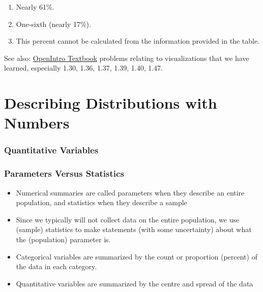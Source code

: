 \documentclass[
  letterpaper,
  DIV=11,
  numbers=noendperiod]{scrreprt}
\providecommand{\tightlist}{%
  \setlength{\itemsep}{0pt}\setlength{\parskip}{0pt}}\usepackage{longtable,booktabs,array}
\begin{document}
\begin{enumerate}
\def\labelenumi{\alph{enumi}.}
\tightlist
\item
  Nearly 61\%.
\item
  One-sixth (nearly 17\%).
\item
  This percent cannot be calculated from the information provided in the
  table.
\end{enumerate}

See also:
\href{https://stats.libretexts.org/Bookshelves/Introductory_Statistics/Book\%3A_OpenIntro_Statistics_(Diez_et_al)./01\%3A_Introduction_to_Data/1.E\%3A_Introduction_to_Data_(Exercises)}{OpenIntro
Textbook} problems relating to visualizations that we have learned,
especially 1.30, 1.36, 1.37, 1.39, 1.40, 1.47.

\hypertarget{describing-distributions-with-numbers}{%
\chapter{Describing Distributions with
Numbers}\label{describing-distributions-with-numbers}}

\hypertarget{quantitative-variables-1}{%
\subsection{Quantitative Variables}\label{quantitative-variables-1}}

\hypertarget{parameters-versus-statistics}{%
\subsection{Parameters Versus
Statistics}\label{parameters-versus-statistics}}

\begin{itemize}
\tightlist
\item
  Numerical summaries are called parameters when they describe an entire
  population, and statistics when they describe a sample
\item
  Since we typically will not collect data on the entire population, we
  use (sample) statistics to make statements (with some uncertainty)
  about what the (population) parameter is.
\item
  Categorical variables are summarized by the count or proportion
  (percent) of the data in each category.
\item
  Quantitative variables are summarized by the centre and spread of the
  data
\end{itemize}
\end{document}
